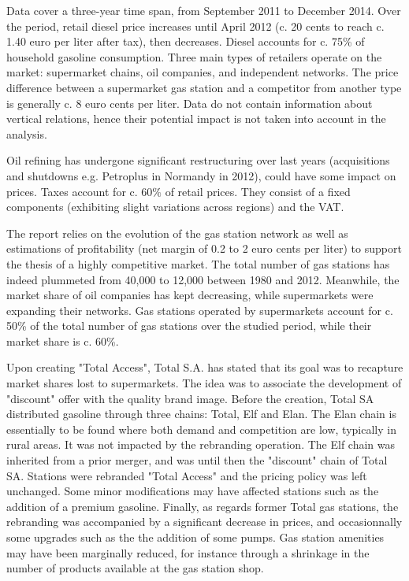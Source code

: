\documentclass[english]{article}
\begin{document}
Data cover a three-year time span, from September 2011 to December 2014. Over the period, retail diesel price increases until April 2012 (c. 20 cents to reach c. 1.40 euro per liter after tax), then decreases. Diesel accounts for c. 75\% of household gasoline consumption. Three main types of retailers operate on the market: supermarket chains, oil companies, and independent networks. The price difference between a supermarket gas station and a competitor from another type is generally c. 8 euro cents per liter. Data do not contain information about vertical relations, hence their potential impact is not taken into account in the analysis.

Oil refining has undergone significant restructuring over last years (acquisitions and shutdowns e.g. Petroplus in Normandy in 2012), could have some impact on prices. Taxes account for c. 60$\%$ of retail prices. They consist of a fixed components (exhibiting slight variations across regions) and the VAT.
\medskip{}

The \cite{BEL12} report relies on the evolution of the gas station network as well as estimations of profitability (net margin of 0.2 to 2 euro cents per liter) to support the thesis of a highly competitive market. The total number of gas stations
has indeed plummeted from 40,000 to 12,000 between 1980 and 2012. Meanwhile, the market share of oil companies has kept decreasing, while supermarkets were expanding their networks. Gas stations operated by supermarkets account for c. 50\% of the total number of gas stations over the studied period, while their market share is c. 60\%.
\medskip{}

Upon creating "Total Access", Total S.A. has stated that its goal was to recapture market shares lost to supermarkets. The idea was to associate the development of "discount" offer with the quality brand image. Before the creation, Total SA distributed gasoline through three chains: Total, Elf and Elan. The Elan chain is essentially to be found where both demand and competition are low, typically in rural areas. It was not impacted by the rebranding operation. The Elf chain was inherited from a prior merger, and was until then the "discount" chain of Total SA. Stations were rebranded "Total Access" and the pricing policy was left unchanged. Some minor modifications may have affected stations such as the addition of a premium gasoline. Finally, as regards former Total gas stations, the rebranding was accompanied by a significant decrease in prices, and occasionnally some upgrades such as the the addition of some pumps. Gas station amenities may have been marginally reduced, for instance through a shrinkage in the number of products available at the gas station shop.
\medskip{}
\end{document}
